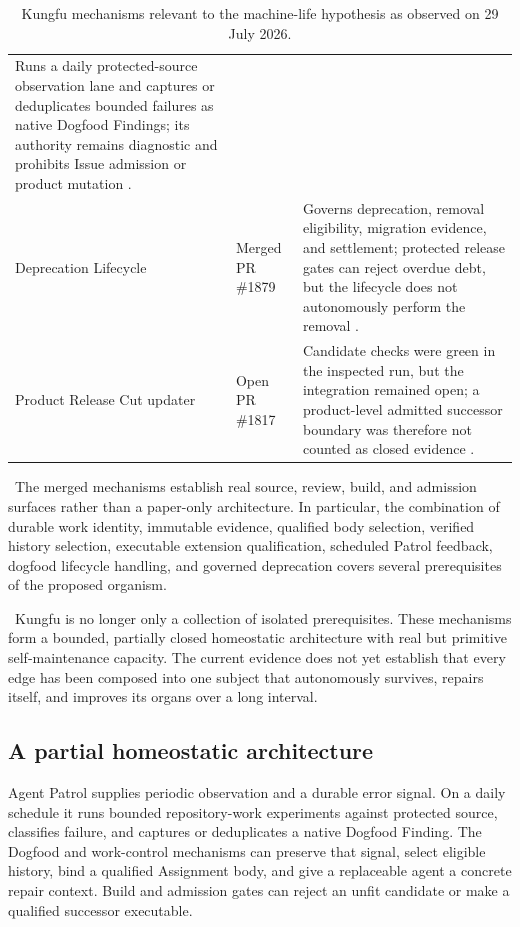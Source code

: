 \begin{table}[ht]
\begin{tabularx}{\textwidth}{@{}p{}p{}X@{}}
Runs a daily protected-source observation lane and captures or deduplicates
bounded failures as native Dogfood Findings; its authority remains diagnostic
and prohibits Issue admission or product mutation
\cite{kungfu1729,kungfu1855}. \\
Deprecation Lifecycle & Merged PR \#1879 &
Governs deprecation, removal eligibility, migration evidence, and settlement;
protected release gates can reject overdue debt, but the lifecycle does not
autonomously perform the removal \cite{kungfu1879}. \\
Product Release Cut updater & Open PR \#1817 &
Candidate checks were green in the inspected run, but the integration remained
open; a product-level admitted successor boundary was therefore not counted as
closed evidence \cite{kungfu1817}. \\
\bottomrule
\end{tabularx}
\caption{Kungfu mechanisms relevant to the machine-life hypothesis as observed
on 29 July 2026.}
\label{tab:evidence}
\end{table}

\factlabel\ The merged mechanisms establish real source, review, build, and
admission surfaces rather than a paper-only architecture. In particular, the
combination of durable work identity, immutable evidence, qualified body
selection, verified history selection, executable extension qualification,
scheduled Patrol feedback, dogfood lifecycle handling, and governed
deprecation covers several prerequisites of the proposed organism.

\inferencelabel\ Kungfu is no longer only a collection of isolated
prerequisites. These mechanisms form a bounded, partially closed homeostatic
architecture with real but primitive self-maintenance capacity. The current
evidence does not yet establish that every edge has been composed into one
subject that autonomously survives, repairs itself, and improves its organs
over a long interval.

\subsection{A partial homeostatic architecture}

Agent Patrol supplies periodic observation and a durable error signal. On a
daily schedule it runs bounded repository-work experiments against protected
source, classifies failure, and captures or deduplicates a native Dogfood
Finding. The Dogfood and work-control mechanisms can preserve that signal,
select eligible history, bind a qualified Assignment body, and give a
replaceable agent a concrete repair context. Build and admission gates can
reject an unfit candidate or make a qualified successor executable.

